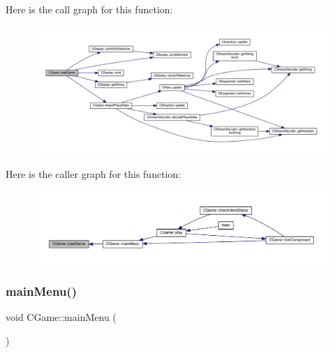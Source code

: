 Here is the call graph for this function\+:\nopagebreak
\begin{figure}[H]
\begin{center}
\leavevmode
\includegraphics[width=350pt]{class_c_game_accda079824fc813cbd64b4743846ae24_cgraph}
\end{center}
\end{figure}
Here is the caller graph for this function\+:\nopagebreak
\begin{figure}[H]
\begin{center}
\leavevmode
\includegraphics[width=350pt]{class_c_game_accda079824fc813cbd64b4743846ae24_icgraph}
\end{center}
\end{figure}
\mbox{\label{class_c_game_a39e1e296c6dcabbf5c824eea6424d6d9}} 
\subsubsection{\texorpdfstring{main\+Menu()}{mainMenu()}}
{\footnotesize\ttfamily void C\+Game\+::main\+Menu (\begin{DoxyParamCaption}{ }\end{DoxyParamCaption})\hspace{0.3cm}{\ttfamily [protected]}}

